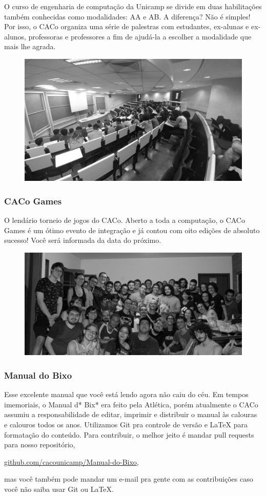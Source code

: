 O curso de engenharia de computação da Unicamp se divide em duas habilitações
também conhecidas como modalidades: AA e AB. A diferença? Não é simples! Por
isso, o CACo organiza uma série de palestras com estudantes, ex-alunas e
ex-alunos, professoras e professores a fim de ajudá-la a escolher a modalidade
que mais lhe agrada.

\begin{figure}[H]
  \centering
  \includegraphics[width=.45\textwidth]{img/alem_da_graduacao/caco_aaab.jpg}
\end{figure}


\subsubsection{CACo Games}

O lendário torneio de jogos do CACo. Aberto a toda a computação, o CACo Games é
um ótimo evento de integração e já contou com oito edições de absoluto sucesso!
Você será informada da data do próximo.

\begin{figure}[H]
  \centering
  \includegraphics[width=.45\textwidth]{img/alem_da_graduacao/caco_games.jpg}
\end{figure}

\subsubsection{Manual do Bixo}

Esse excelente manual que você está lendo agora não caiu do céu. Em tempos
imemoriais, o Manual d* Bix* era feito pela Atlética, porém atualmente o CACo
assumiu a responsabilidade de editar, imprimir e distribuir o manual às
calouras e calouros todos os anos. Utilizamos Git pra controle de versão e
{\LaTeX} para formatação do conteúdo. Para contribuir, o melhor jeito é mandar
pull requests para nosso repositório,
\begin{center}
\url{github.com/cacounicamp/Manual-do-Bixo},\\
\end{center}
mas você também pode mandar um e-mail pra gen\-te com as contribuições caso
você não saiba usar Git ou \LaTeX.
